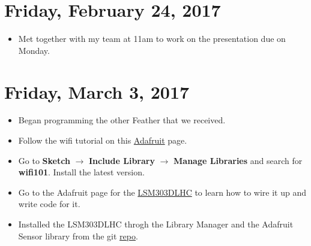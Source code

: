 \documentclass[12pt]{article}
\begin{document}
\section{Friday, February 24, 2017}
\begin{itemize}
\item Met together with my team at 11am to work on the presentation due on Monday.
\end{itemize}

\section{Friday, March 3, 2017}
\begin{itemize}
\item Began programming the other Feather that we received.
\item Follow the wifi tutorial on this \href{https://learn.adafruit.com/adafruit-feather-m0-wifi-atwinc1500/using-the-wifi-module}{Adafruit} page.
\item Go to \textbf{Sketch} $\rightarrow$ \textbf{Include Library} $\rightarrow$ \textbf{Manage Libraries} and search for \textbf{wifi101}. Install the latest version.
\item Go to the Adafruit page for the \href{https://learn.adafruit.com/lsm303-accelerometer-slash-compass-breakout/assembly-and-wiring}{LSM303DLHC} to learn how to wire it up and write code for it.
\item Installed the LSM303DLHC throgh the Library Manager and the Adafruit Sensor library from the git \href{https://github.com/adafruit/Adafruit_Sensor}{repo}.
\end{itemize}
\end{document}
